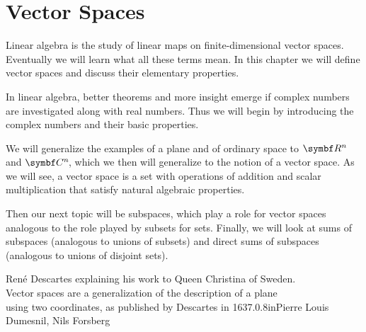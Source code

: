 

\chapter{Vector Spaces} \label{VectorSpaces} %



Linear algebra is the study of linear maps on finite-dimensional vector spaces.  Eventually we will learn what all these terms mean.  In this chapter we will define vector spaces and discuss their elementary properties.

In linear algebra, better theorems and
more insight emerge if  complex numbers are investigated along with real
numbers.  Thus we will begin by introducing the complex numbers and their basic
properties.

We will generalize the examples of a plane and of ordinary space to $\R{n}$ and $\CC{n}$, which we then will generalize to the notion of a vector space. As we will see, a vector space is a set with operations of addition and scalar multiplication that satisfy natural algebraic properties.

Then our next topic will be subspaces, which play a role for vector spaces analogous to the role played by subsets for sets. Finally, we will look at sums of subspaces (analogous to unions of subsets) and direct sums of subspaces (analogous to unions of disjoint sets).

%
{Ren\'e Descartes explaining his work to Queen Christina of Sweden.\\Vector spaces are a generalization of the description of a plane\\using two coordinates, as published by Descartes in 1637.}{0.8in}{Pierre Louis Dumesnil, Nils Forsberg}

